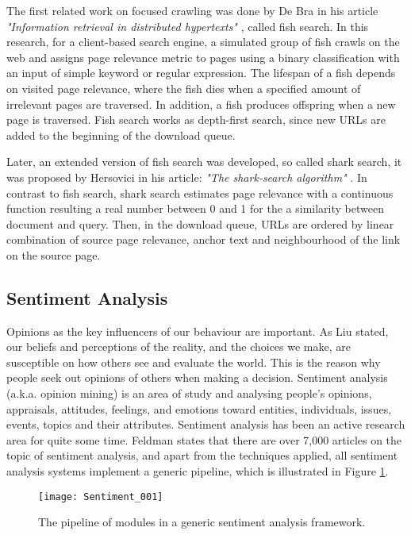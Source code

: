 	The first related work on focused crawling was done by De Bra in his article \emph{"Information retrieval in distributed hypertexts"} \cite%
	{B1994}, called fish search. In this research, for a client-based search engine, a simulated group of fish crawls on the web and assigns page relevance metric to pages using a binary classification with an input of simple keyword or regular expression. The lifespan of a fish depends on visited page relevance, where the fish dies when a specified amount of irrelevant pages are traversed. In addition, a fish produces offspring when a new page is traversed. Fish search works as depth-first search, since new URLs are added to the beginning of the download queue.
	
	Later, an extended version of fish search was developed, so called shark search, it was proposed by Hersovici in his article: \emph{"The shark-search algorithm"} \cite%
	{H1998}. In contrast to fish search, shark search estimates page relevance with a continuous function resulting a real number between 0 and 1 for the a similarity between document and query. Then, in the download queue, URLs are ordered by linear combination of source page relevance, anchor text and neighbourhood of the link on the source page.

	\subsection{Sentiment Analysis}
	
	Opinions as the key influencers of our behaviour are important. As Liu \cite%
	{L2011} stated, our beliefs and perceptions of the reality, and the choices we make, are susceptible on how others see and evaluate the world. This is the reason why people seek out opinions of others when making a decision. Sentiment analysis (a.k.a. opinion mining) is an area of study and analysing people's opinions, appraisals, attitudes, feelings, and emotions toward entities, individuals, issues, events, topics and their attributes. Sentiment analysis has been an active research area for quite some time. Feldman \cite%
	{F2013} states that there are over 7,000 articles on the topic of sentiment analysis, and apart from the techniques applied, all sentiment analysis systems implement a generic pipeline, which is illustrated in Figure \ref{fig:Sentiment_001}.
	
	\begin{figure}\centering
		\texttt{[image: Sentiment\_001]}
		\caption{The pipeline of modules in a generic sentiment analysis framework.}\label{fig:Sentiment_001}
	\end{figure}
	
